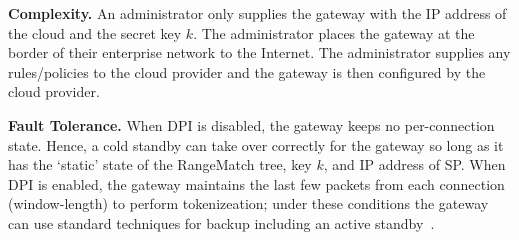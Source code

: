 \noindent\textbf{Complexity.}
An administrator only supplies the gateway with the IP address of the cloud and the secret key $k$.
The administrator places the gateway at the border of their enterprise network to the Internet.
The administrator supplies any rules/policies to the cloud provider and the gateway is then configured by the cloud provider.

\noindent\textbf{Fault Tolerance.}
When DPI is disabled, the gateway keeps no per-connection state. Hence, a cold standby can take over correctly for the gateway so long as it has the `static' state of the RangeMatch tree, key $k$, and IP address of SP.
When DPI is enabled, the gateway maintains the last few packets from each connection (window-length) to perform tokenizeation; under these conditions the gateway can use standard techniques for backup including an active standby~\cite{colo}.
